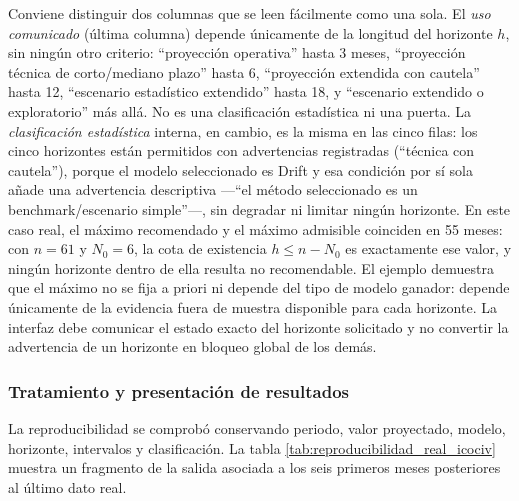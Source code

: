 \documentclass[12pt,letterpaper]{article}
\begin{document}
Conviene distinguir dos columnas que se leen fácilmente como una sola. El \emph{uso comunicado} (última columna) depende únicamente de la longitud del horizonte \(h\), sin ningún otro criterio: ``proyección operativa'' hasta 3 meses, ``proyección técnica de corto/mediano plazo'' hasta 6, ``proyección extendida con cautela'' hasta 12, ``escenario estadístico extendido'' hasta 18, y ``escenario extendido o exploratorio'' más allá. No es una clasificación estadística ni una puerta. La \emph{clasificación estadística} interna, en cambio, es la misma en las cinco filas: los cinco horizontes están permitidos con advertencias registradas (``técnica con cautela''), porque el modelo seleccionado es Drift y esa condición por sí sola añade una advertencia descriptiva ---``el método seleccionado es un benchmark/escenario simple''---, sin degradar ni limitar ningún horizonte. En este caso real, el máximo recomendado y el máximo admisible coinciden en 55 meses: con \(n=61\) y \(N_0=6\), la cota de existencia \(h\leq n-N_0\) es exactamente ese valor, y ningún horizonte dentro de ella resulta no recomendable. El ejemplo demuestra que el máximo no se fija a priori ni depende del tipo de modelo ganador: depende únicamente de la evidencia fuera de muestra disponible para cada horizonte. La interfaz debe comunicar el estado exacto del horizonte solicitado y no convertir la advertencia de un horizonte en bloqueo global de los demás.

\subsubsection{Tratamiento y presentación de resultados}

La reproducibilidad se comprobó conservando periodo, valor proyectado, modelo, horizonte, intervalos y clasificación. La tabla \ref{tab:reproducibilidad_real_icociv} muestra un fragmento de la salida asociada a los seis primeros meses posteriores al último dato real.
\end{document}
